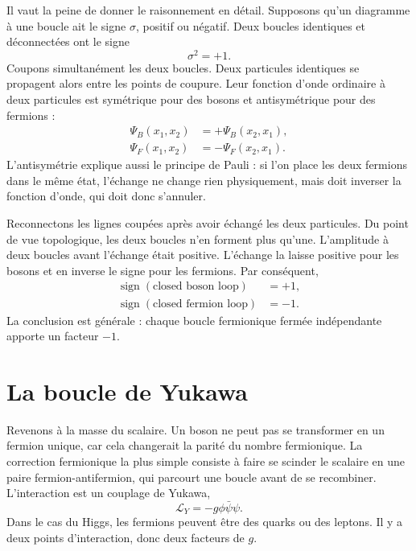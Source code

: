 Il vaut la peine de donner le raisonnement en détail. Supposons qu’un diagramme à une boucle ait le signe \(\sigma\), positif ou négatif. Deux boucles identiques et déconnectées ont le signe
\begin{equation}
\sigma^2=+1.
\end{equation}
Coupons simultanément les deux boucles. Deux particules identiques se propagent alors entre les points de coupure. Leur fonction d’onde ordinaire à deux particules est symétrique pour des bosons et antisymétrique pour des fermions :
\begin{align}
\Psi_B(x_1,x_2)&=+\Psi_B(x_2,x_1),\\
\Psi_F(x_1,x_2)&=-\Psi_F(x_2,x_1).
\end{align}
L’antisymétrie explique aussi le principe de Pauli : si l’on place les deux fermions dans le même état, l’échange ne change rien physiquement, mais doit inverser la fonction d’onde, qui doit donc s’annuler.

Reconnectons les lignes coupées après avoir échangé les deux particules. Du point de vue topologique, les deux boucles n’en forment plus qu’une. L’amplitude à deux boucles avant l’échange était positive. L’échange la laisse positive pour les bosons et en inverse le signe pour les fermions. Par conséquent,
\begin{equation}
\begin{aligned}
\operatorname{sign}(\text{closed boson loop})&=+1,\\
\operatorname{sign}(\text{closed fermion loop})&=-1.
\end{aligned}
\end{equation}
La conclusion est générale : chaque boucle fermionique fermée indépendante apporte un facteur \(-1\).

\section{La boucle de Yukawa}

Revenons à la masse du scalaire. Un boson ne peut pas se transformer en un fermion unique, car cela changerait la parité du nombre fermionique. La correction fermionique la plus simple consiste à faire se scinder le scalaire en une paire fermion-antifermion, qui parcourt une boucle avant de se recombiner. L’interaction est un couplage de Yukawa,
\begin{equation}
\mathcal L_Y=-g\phi\bar\psi\psi.
\end{equation}
Dans le cas du Higgs, les fermions peuvent être des quarks ou des leptons. Il y a deux points d’interaction, donc deux facteurs de \(g\).

